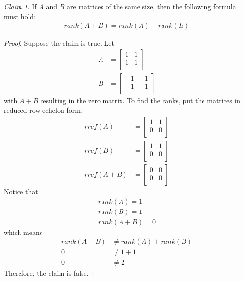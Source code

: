 \documentclass[letterpaper,12pt]{report}
\theoremstyle{remark}
\newtheorem*{claim}{Claim}
\begin{document}
\begin{claim}
If $A$ and $B$ are matrices of the same size, then the following formula must hold:
\begin{align*}
  rank(A + B) = rank(A) + rank(B)
\end{align*}
\end{claim}

\begin{proof}
Suppose the claim is true. Let
\begin{align*}
  A &= \begin{bmatrix}
    1 & 1 \\
    1 & 1 \\
  \end{bmatrix} \\
  B &= \begin{bmatrix}
    -1 & -1 \\
    -1 & -1 \\
  \end{bmatrix}
\end{align*}
with $A + B$ resulting in the zero matrix. To find the ranks, put the matrices in reduced row-echelon form:
\begin{align*}
  rref(A) &= \begin{bmatrix}
    1 & 1 \\
    0 & 0 \\
  \end{bmatrix} \\
  rref(B) &= \begin{bmatrix}
    1 & 1 \\
    0 & 0 \\
  \end{bmatrix} \\
  rref(A + B) &= \begin{bmatrix}
    0 & 0 \\
    0 & 0 \\
  \end{bmatrix}
\end{align*}
Notice that
\begin{align*}
  rank(A) = 1 \\
  rank(B) = 1 \\
  rank(A + B) = 0
\end{align*}
which means
\begin{align*}
  rank(A + B) &\ne rank(A) + rank(B) \\
  0 &\ne 1 + 1 \\
  0 &\ne 2
\end{align*}
Therefore, the claim is false.
\end{proof}
\end{document}
